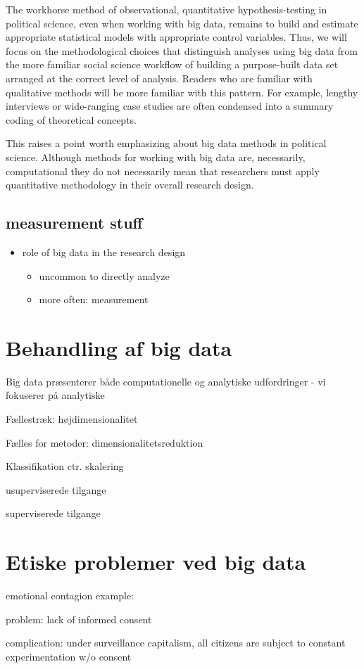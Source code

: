 \documentclass[12pt,]{article}
\providecommand{\tightlist}{%
  \setlength{\itemsep}{0pt}\setlength{\parskip}{0pt}}
\begin{document}
The workhorse method of observational, quantitative hypothesis-testing
in political science, even when working with big data, remains to build
and estimate appropriate statistical models with appropriate control
variables. Thus, we will focus on the methodological choices that
distinguish analyses using big data from the more familiar social
science workflow of building a purpose-built data set arranged at the
correct level of analysis. Readers who are familiar with qualitative
methods will be more familiar with this pattern. For example, lengthy
interviews or wide-ranging case studies are often condensed into a
summary coding of theoretical concepts.

This raises a point worth emphasizing about big data methods in
political science. Although methods for working with big data are,
necessarily, computational they do not necessarily mean that researchers
must apply quantitative methodology in their overall research design.

\hypertarget{measurement-stuff}{%
\subsection{measurement stuff}\label{measurement-stuff}}

\begin{itemize}
\tightlist
\item
  role of big data in the research design

  \begin{itemize}
  \tightlist
  \item
    uncommon to directly analyze
  \item
    more often: measurement
  \end{itemize}
\end{itemize}

\hypertarget{behandling-af-big-data}{%
\section{Behandling af big data}\label{behandling-af-big-data}}

Big data præsenterer både computationelle og analytiske udfordringer -
vi fokuserer på analytiske

Fællestræk: højdimensionalitet

Fælles for metoder: dimensionalitetsreduktion

Klassifikation ctr. skalering

usuperviserede tilgange

superviserede tilgange

\hypertarget{etiske-problemer-ved-big-data}{%
\section{Etiske problemer ved big
data}\label{etiske-problemer-ved-big-data}}

emotional contagion example: \citet{kramer2014experimental}

problem: lack of informed consent

complication: under surveillance capitalism, all citizens are subject to
constant experimentation w/o consent


\end{document}
